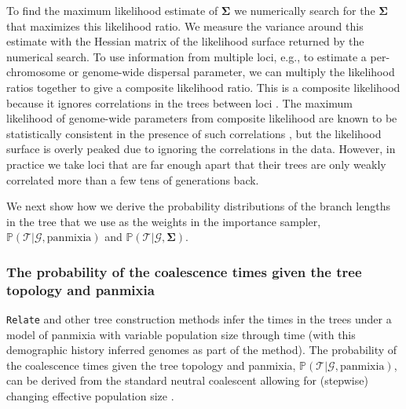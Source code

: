 \documentclass[12pt]{article}
\begin{document}
To find the maximum likelihood estimate of $\mathbf{\Sigma}$ we numerically search for the $\mathbf{\Sigma}$ that maximizes this likelihood ratio. 
We measure the variance around this estimate with the Hessian matrix of the likelihood surface returned by the numerical search. 
To use information from multiple loci, e.g., to estimate a per-chromosome or genome-wide dispersal parameter, we can multiply the likelihood ratios together to give a composite likelihood ratio.
This is a composite likelihood because it ignores correlations in the trees between loci \citep{hudson2001two,larribe2011composite,varin2011overview}. The maximum likelihood of genome-wide parameters from composite likelihood are known to be statistically consistent in the presence of such correlations \citep{wiuf2006consistency}, but the likelihood surface is overly peaked due to ignoring the correlations in the data. 
However, in practice we take loci that are far enough apart that their trees are only weakly correlated more than a few tens of generations back.

We next show how we derive the probability distributions of the branch lengths in the tree that we use as the weights in the importance sampler, $\mathbb{P}(\mathcal{T} | \mathcal{G}, \mathrm{panmixia})$ and $\mathbb{P}(\mathcal{T} | \mathcal{G}, \mathbf{\Sigma})$.

\subsubsection*{The probability of the coalescence times given the tree topology and panmixia}

\texttt{Relate} and other tree construction methods infer the times in the trees under a model of panmixia with variable population size through time (with this demographic history inferred genomes as part of the method). 
The probability of the coalescence times given the tree topology and panmixia, $\mathbb{P}(\mathcal{T} | \mathcal{G}, \mathrm{panmixia})$, can be derived from the standard neutral coalescent allowing for (stepwise) changing effective population size \citep{griffiths1994sampling,meligkotsidou2007postprocessing}.
 
\end{document}
